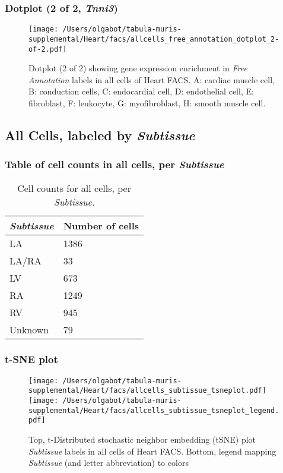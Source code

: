 \clearpage

\subsubsection{Dotplot (2 of 2, \emph{Tnni3})}
\begin{figure}[h]
\centering
\texttt{[image: /Users/olgabot/tabula-muris-supplemental/Heart/facs/allcells\_free\_annotation\_dotplot\_2-of-2.pdf]}

\caption{ Dotplot (2 of 2)  showing gene expression enrichment in \emph{Free Annotation} labels in all cells of Heart FACS. A: cardiac muscle cell, B: conduction cells, C: endocardial cell, D: endothelial cell, E: fibroblast, F: leukocyte, G: myofibroblast, H: smooth muscle cell.}
\end{figure}


\clearpage

\subsection{All Cells, labeled by \emph{Subtissue}}
\subsubsection{Table of cell counts in all cells, per \emph{Subtissue}}\begin{table}[h]
\centering
\label{my-label}
\begin{tabular}{@{}ll@{}}
\toprule

\emph{Subtissue}& Number of cells \\ \midrule
LA & 1386 \\

LA/RA & 33 \\

LV & 673 \\

RA & 1249 \\

RV & 945 \\

Unknown & 79 \\
\bottomrule
\end{tabular}
\caption{Cell counts for all cells, per \emph{Subtissue}.}
\end{table}

\clearpage
\subsubsection{t-SNE plot}
\begin{figure}[h]
\centering
\texttt{[image: /Users/olgabot/tabula-muris-supplemental/Heart/facs/allcells\_subtissue\_tsneplot.pdf]}
\texttt{[image: /Users/olgabot/tabula-muris-supplemental/Heart/facs/allcells\_subtissue\_tsneplot\_legend.pdf]}
\caption{Top, t-Distributed stochastic neighbor embedding (tSNE) plot  \emph{Subtissue} labels in all cells of Heart FACS. Bottom, legend mapping \emph{Subtissue} (and letter abbreviation) to colors}
\end{figure}


